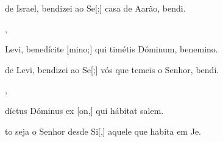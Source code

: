 {    {\item {} de Israel, bendizei ao Se[;] casa de Aarão, bendi.~\Antiphona},
  {\item {} Levi, benedícite [mino;] qui timétis Dóminum, benemino.~\Antiphona}%
    {\item {} de Levi, bendizei ao Se[;] vós que temeis o Senhor, bendi.~\Antiphona},
  {\item {}díctus Dóminus ex [on,] qui hábitat \-sa\-lem.~\Antiphona}%
    {\item {}to seja o Senhor desde Si[,] aquele que habita em Je.~\Antiphona}
}